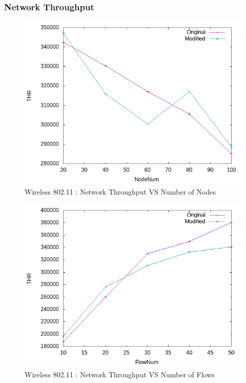 \subsubsection{Network Throughput}

    \begin{figure}[!h] 
        \centering
        \includegraphics[width=.8\textwidth]{Pictures/Wireless802.11Mobile/Combined/THRVSNodeNum.png}
         \caption{Wireless 802.11 : Network Throughput VS Number of Nodes}
    \end{figure}
    
     \begin{figure}[!h] 
        \centering
        \includegraphics[width=.8\textwidth]{Pictures/Wireless802.11Mobile/Combined/THRVSFlowNum.png}
         \caption{Wireless 802.11 : Network Throughput VS Number of Flows}
    \end{figure}
    
